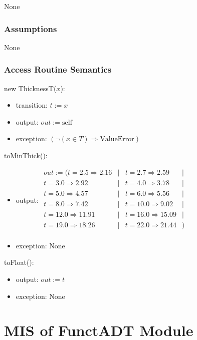 \documentclass[12pt, titlepage]{article}
\begin{document}
None

\subsubsection {Assumptions}

None

\subsubsection {Access Routine Semantics}

\noindent new ThicknessT($x$):
\begin{itemize}
\item transition: $t := x$
\item output: $out := \mbox{self}$
\item exception: $(\neg (x \in T) \Rightarrow \mbox{ValueError})$
\end{itemize}

\noindent toMinThick():
\begin{itemize}
\item output: $\begin{array}{rcrc}
out := ( t  = 2.5 \Rightarrow 2.16 & | & t = 2.7 \Rightarrow 2.59 & |\\
t = 3.0 \Rightarrow 2.92 & | & t = 4.0 \Rightarrow 3.78 & |\\
t = 5.0 \Rightarrow 4.57 & | & t = 6.0 \Rightarrow 5.56 & |\\
t = 8.0 \Rightarrow 7.42 & | & t = 10.0 \Rightarrow 9.02 & |\\
t = 12.0 \Rightarrow 11.91 & | & t = 16.0 \Rightarrow 15.09 & |\\
t = 19.0 \Rightarrow 18.26 & | & t = 22.0 \Rightarrow 21.44 & )\\
\end{array}$
\item exception: None
\end{itemize}

\noindent toFloat():
\begin{itemize}
\item output: $out := t$
\item exception: None
\end{itemize}

\newpage


\section{MIS of FunctADT Module} \label{FunctADT}
\end{document}

